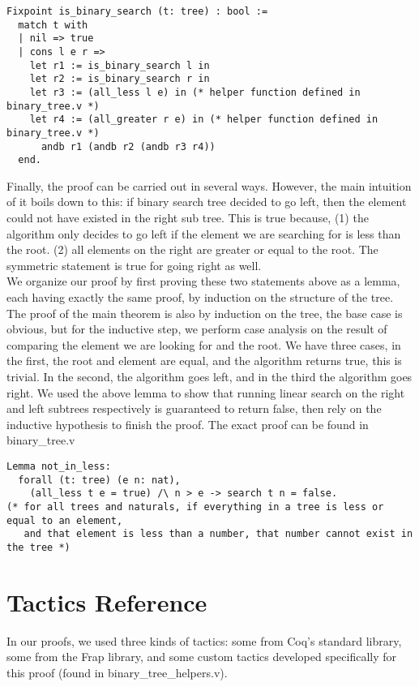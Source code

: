 \documentclass{article}
\begin{document}
\begin{verbatim}
Fixpoint is_binary_search (t: tree) : bool :=
  match t with
  | nil => true
  | cons l e r =>
    let r1 := is_binary_search l in
    let r2 := is_binary_search r in
    let r3 := (all_less l e) in (* helper function defined in binary_tree.v *)
    let r4 := (all_greater r e) in (* helper function defined in binary_tree.v *)
      andb r1 (andb r2 (andb r3 r4))
  end.
\end{verbatim}

Finally, the proof can be carried out in several ways. However, the main intuition of it boils down to this:
if binary search tree decided to go left, then the element could not have existed in the right sub tree. This is true because,
(1) the algorithm only decides to go left if the element we are searching for is less than the root. (2) all elements
on the right are greater or equal to the root. The symmetric statement is true for going right as well. \\

We organize our proof by first proving these two statements above as a lemma, each having exactly the same proof, by induction
on the structure of the tree. The proof of the main theorem is also by induction on the tree, the base case is obvious, but
for the inductive step, we perform case analysis on the result of comparing the element we are looking for and the root. We
have three cases, in the first, the root and element are equal, and the algorithm returns true, this is trivial. In the second,
the algorithm goes left, and in the third the algorithm goes right. We used the above lemma to show that running linear
search on the right and left subtrees respectively is guaranteed to return false, then rely on the inductive hypothesis
to finish the proof. The exact proof can be found in binary\_tree.v 

\begin{verbatim}
Lemma not_in_less:
  forall (t: tree) (e n: nat),
    (all_less t e = true) /\ n > e -> search t n = false.
(* for all trees and naturals, if everything in a tree is less or equal to an element,
   and that element is less than a number, that number cannot exist in the tree *)
\end{verbatim}

\section{Tactics Reference}
In our proofs, we used three kinds of tactics: some from Coq's standard library, some from the Frap library, and some custom
tactics developed specifically for this proof (found in binary\_tree\_helpers.v). \\
\end{document}
